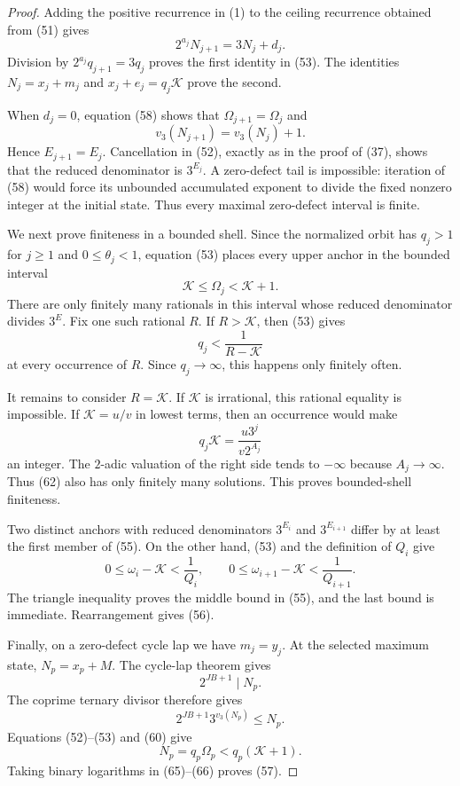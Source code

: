\documentclass[11pt]{article}
\begin{document}
\begin{proof}
Adding the positive recurrence in (1) to the ceiling recurrence obtained
from (51) gives
\[
  2^{a_j}N_{j+1}=3N_j+d_j.
  \tag{58}
\]
Division by $2^{a_j}q_{j+1}=3q_j$ proves the first identity in (53).
The identities $N_j=x_j+m_j$ and $x_j+e_j=q_j\mathcal K$ prove the second.

When $d_j=0$, equation (58) shows that $\Omega_{j+1}=\Omega_j$ and
\[
  v_3(N_{j+1})=v_3(N_j)+1.
  \tag{59}
\]
Hence $E_{j+1}=E_j$.  Cancellation in (52), exactly as in the proof of
(37), shows that the reduced denominator is $3^{E_j}$.  A zero-defect tail
is impossible: iteration of (58) would force its unbounded accumulated
exponent to divide the fixed nonzero integer at the initial state.  Thus
every maximal zero-defect interval is finite.

We next prove finiteness in a bounded shell.  Since the normalized orbit
has $q_j>1$ for $j\geq1$ and $0\leq\theta_j<1$, equation (53) places every
upper anchor in the bounded interval
\[
  \mathcal K\leq\Omega_j<\mathcal K+1.
  \tag{60}
\]
There are only finitely many rationals in this interval whose reduced
denominator divides $3^E$.  Fix one such rational $R$.  If
$R>\mathcal K$, then (53) gives
\[
  q_j<\frac1{R-\mathcal K}
  \tag{61}
\]
at every occurrence of $R$.  Since $q_j\to\infty$, this happens only
finitely often.

It remains to consider $R=\mathcal K$.  If $\mathcal K$ is irrational,
this rational equality is impossible.  If $\mathcal K=u/v$ in lowest terms,
then an occurrence would make
\[
  q_j\mathcal K=\frac{u3^j}{v2^{A_j}}
  \tag{62}
\]
an integer.  The $2$-adic valuation of the right side tends to $-\infty$
because $A_j\to\infty$.  Thus (62) also has only finitely many solutions.
This proves bounded-shell finiteness.

Two distinct anchors with reduced denominators $3^{E_i}$ and
$3^{E_{i+1}}$ differ by at least the first member of (55).  On the other
hand, (53) and the definition of $Q_i$ give
\[
  0\leq\omega_i-\mathcal K<\frac1{Q_i},
  \qquad
  0\leq\omega_{i+1}-\mathcal K<\frac1{Q_{i+1}}.
  \tag{63}
\]
The triangle inequality proves the middle bound in (55), and the last bound
is immediate.  Rearrangement gives (56).

Finally, on a zero-defect cycle lap we have $m_j=y_j$.  At the selected
maximum state, $N_p=x_p+M$.  The cycle-lap theorem gives
\[
  2^{JB+1}\mid N_p.
  \tag{64}
\]
The coprime ternary divisor therefore gives
\[
  2^{JB+1}3^{v_3(N_p)}\leq N_p.
  \tag{65}
\]
Equations (52)--(53) and (60) give
\[
  N_p=q_p\Omega_p<q_p(\mathcal K+1).
  \tag{66}
\]
Taking binary logarithms in (65)--(66) proves (57).
\end{proof}
\end{document}
